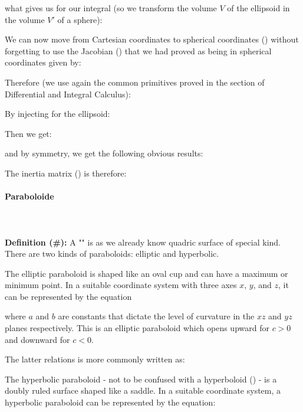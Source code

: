 {	what gives us for our integral (so we transform the volume $V$ of the ellipsoid in the volume $V'$ of a sphere):
	
	We can now move from Cartesian coordinates to spherical coordinates () without forgetting to use the Jacobian () that we had proved as being in spherical coordinates given by:
	
	Therefore (we use again the common primitives proved in the section of Differential and Integral Calculus):
	
	By injecting for the ellipsoid:
	
	Then we get:
	
	and by symmetry, we get the following obvious results:
	
	The inertia matrix () is therefore:
	
	
	\paragraph{Paraboloide}\mbox{}\\\\
	\textbf{Definition (\#\mydef):} A "" is as we already know quadric surface of special kind. There are two kinds of paraboloids: elliptic and hyperbolic.
	
	The elliptic paraboloid is shaped like an oval cup and can have a maximum or minimum point. In a suitable coordinate system with three axes $x$, $y$, and $z$, it can be represented by the equation
	
	where $a$ and $b$ are constants that dictate the level of curvature in the $xz$ and $yz$ planes respectively. This is an elliptic paraboloid which opens upward for $c > 0$ and downward for $c < 0$.
	
	The latter relations is more commonly written as:
	
	
	The hyperbolic paraboloid - not to be confused with a hyperboloid () - is a doubly ruled surface shaped like a saddle. In a suitable coordinate system, a hyperbolic paraboloid can be represented by the equation:
	
}
